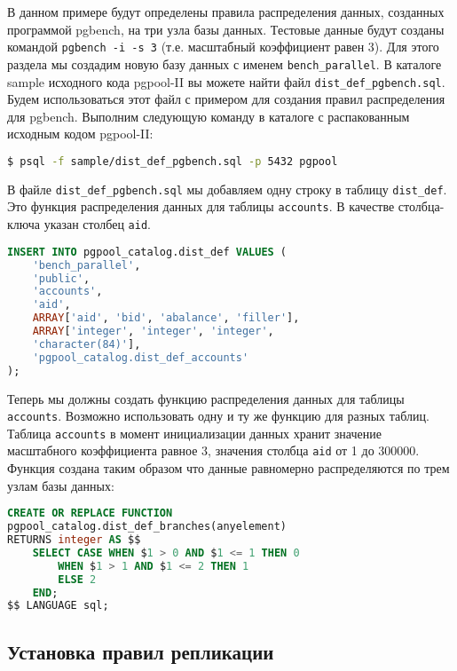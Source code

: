В данном примере будут определены правила распределения данных, созданных программой pgbench, на три узла базы данных. Тестовые данные будут созданы командой \lstinline!pgbench -i -s 3! (т.е. масштабный коэффициент равен 3). Для этого раздела мы создадим новую базу данных с именем \lstinline!bench_parallel!. В каталоге sample исходного кода pgpool-II вы можете найти файл \lstinline!dist_def_pgbench.sql!. Будем использоваться этот файл с примером для создания правил распределения для pgbench. Выполним следующую команду в каталоге с распакованным исходным кодом pgpool-II:

\begin{lstlisting}[language=Bash,label=lst:pgpool32,caption=Установка правил распределения данных]
$ psql -f sample/dist_def_pgbench.sql -p 5432 pgpool
\end{lstlisting}

В файле \lstinline!dist_def_pgbench.sql! мы добавляем одну строку в таблицу \lstinline!dist_def!. Это функция распределения данных для таблицы \lstinline!accounts!. В качестве столбца-ключа указан столбец \lstinline!aid!.

\begin{lstlisting}[language=SQL,label=lst:pgpool33,caption=Установка правил распределения данных]
INSERT INTO pgpool_catalog.dist_def VALUES (
    'bench_parallel',
    'public',
    'accounts',
    'aid',
    ARRAY['aid', 'bid', 'abalance', 'filler'],
    ARRAY['integer', 'integer', 'integer',
    'character(84)'],
    'pgpool_catalog.dist_def_accounts'
);
\end{lstlisting}

Теперь мы должны создать функцию распределения данных для таблицы \lstinline!accounts!. Возможно использовать одну и ту же функцию для разных таблиц. Таблица \lstinline!accounts! в момент инициализации данных хранит значение масштабного коэффициента равное 3, значения столбца \lstinline!aid! от 1 до 300000. Функция создана таким образом что данные равномерно распределяются по трем узлам базы данных:

\begin{lstlisting}[language=SQL,label=lst:pgpool34,caption=Установка правил распределения данных]
CREATE OR REPLACE FUNCTION
pgpool_catalog.dist_def_branches(anyelement)
RETURNS integer AS $$
    SELECT CASE WHEN $1 > 0 AND $1 <= 1 THEN 0
        WHEN $1 > 1 AND $1 <= 2 THEN 1
        ELSE 2
    END;
$$ LANGUAGE sql;
\end{lstlisting}


\subsection{Установка правил репликации}

